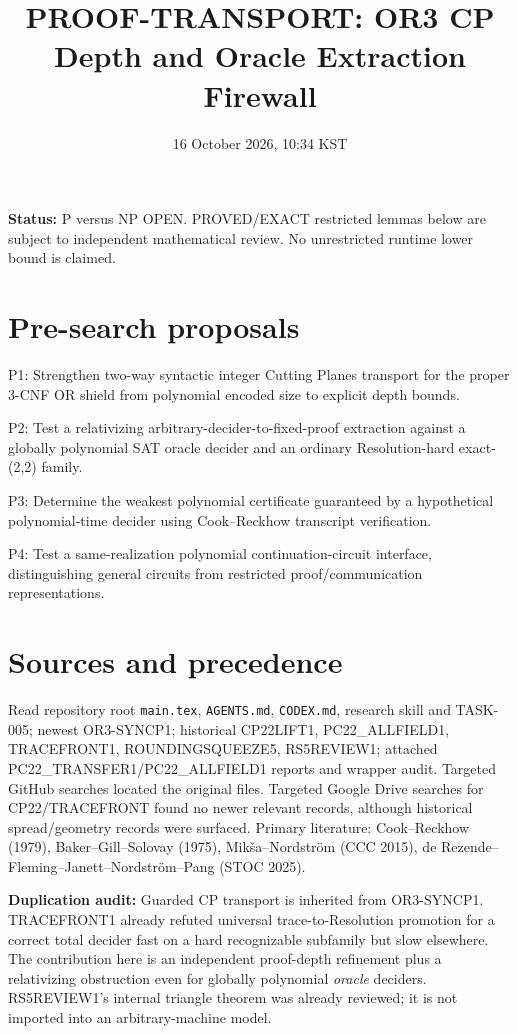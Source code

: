 \documentclass[11pt]{article}
\title{PROOF-TRANSPORT: OR3 CP Depth and Oracle Extraction Firewall}
\date{16 October 2026, 10:34 KST}
\begin{document}
\maketitle
\noindent \textbf{Status:} P versus NP OPEN. PROVED/EXACT restricted lemmas below are subject to independent mathematical review. No unrestricted runtime lower bound is claimed.

\section{Pre-search proposals}
\noindent P1: Strengthen two-way syntactic integer Cutting Planes transport for the proper 3-CNF OR shield from polynomial encoded size to explicit depth bounds.
\par\noindent P2: Test a relativizing arbitrary-decider-to-fixed-proof extraction against a globally polynomial SAT oracle decider and an ordinary Resolution-hard exact-(2,2) family.
\par\noindent P3: Determine the weakest polynomial certificate guaranteed by a hypothetical polynomial-time decider using Cook--Reckhow transcript verification.
\par\noindent P4: Test a same-realization polynomial continuation-circuit interface, distinguishing general circuits from restricted proof/communication representations.

\section{Sources and precedence}
Read repository root \texttt{main.tex}, \texttt{AGENTS.md}, \texttt{CODEX.md}, research skill and TASK-005; newest OR3-SYNCP1; historical CP22LIFT1, PC22\_ALLFIELD1, TRACEFRONT1, ROUNDINGSQUEEZE5, RS5REVIEW1; attached PC22\_TRANSFER1/PC22\_ALLFIELD1 reports and wrapper audit. Targeted GitHub searches located the original files. Targeted Google Drive searches for CP22/TRACEFRONT found no newer relevant records, although historical spread/geometry records were surfaced. Primary literature: Cook--Reckhow (1979), Baker--Gill--Solovay (1975), Mik\v{s}a--Nordstr\"om (CCC 2015), de Rezende--Fleming--Janett--Nordstr\"om--Pang (STOC 2025).
\par\noindent \textbf{Duplication audit:} Guarded CP transport is inherited from OR3-SYNCP1. TRACEFRONT1 already refuted universal trace-to-Resolution promotion for a correct total decider fast on a hard recognizable subfamily but slow elsewhere. The contribution here is an independent proof-depth refinement plus a relativizing obstruction even for globally polynomial \emph{oracle} deciders. RS5REVIEW1's internal triangle theorem was already reviewed; it is not imported into an arbitrary-machine model.
\end{document}

